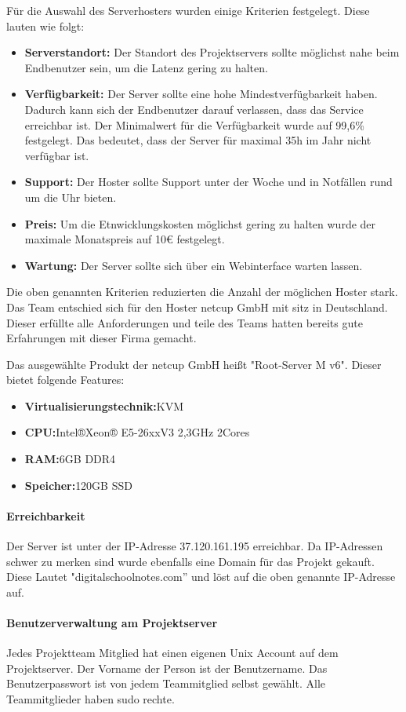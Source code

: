 Für die Auswahl des Serverhosters wurden einige Kriterien festgelegt. Diese lauten wie folgt:
\begin{itemize}
\item \textbf{Serverstandort:} Der Standort des Projektservers sollte möglichst nahe beim Endbenutzer sein, um die \gls{Latenz} gering zu halten.
\item \textbf{Verfügbarkeit:} Der Server sollte eine hohe Mindestverfügbarkeit haben. Dadurch kann sich der Endbenutzer darauf verlassen, dass das Service erreichbar ist. Der Minimalwert für die Verfügbarkeit wurde auf 99,6\% festgelegt. Das bedeutet, dass der Server für maximal 35h im Jahr nicht verfügbar ist.
\item \textbf{Support:} Der Hoster sollte Support unter der Woche und in Notfällen rund um die Uhr bieten.
\item \textbf{Preis:} Um die Etnwicklungskosten möglichst gering zu halten wurde der maximale Monatspreis auf 10€ festgelegt.
\item \textbf{Wartung:} Der Server sollte sich über ein Webinterface warten lassen.
\end{itemize}


Die oben genannten Kriterien reduzierten die Anzahl der möglichen Hoster stark. Das Team entschied sich für den Hoster netcup GmbH mit sitz in Deutschland. Dieser erfüllte alle Anforderungen und teile des Teams hatten bereits gute Erfahrungen mit dieser Firma gemacht.

Das ausgewählte Produkt der netcup GmbH heißt "Root-Server M v6". Dieser bietet folgende Features:
\begin{itemize}
\item \textbf{Virtualisierungstechnik:}\gls{KVM}
\item \textbf{CPU:}Intel®Xeon® E5-26xxV3 2,3GHz 2Cores
\item \textbf{RAM:}6GB DDR4
\item \textbf{Speicher:}120GB SSD
\end{itemize}

\paragraph{Erreichbarkeit}
Der Server ist unter der IP-Adresse 37.120.161.195 erreichbar. Da IP-Adressen schwer zu merken sind wurde ebenfalls eine Domain für das Projekt gekauft. Diese Lautet "digitalschoolnotes.com'' und löst auf die oben genannte IP-Adresse auf.

\paragraph{Benutzerverwaltung am Projektserver}
Jedes Projektteam Mitglied hat einen eigenen Unix Account auf dem Projektserver. Der Vorname der Person ist der Benutzername. Das Benutzerpasswort ist von jedem Teammitglied selbst gewählt. Alle Teammitglieder haben sudo rechte. 

